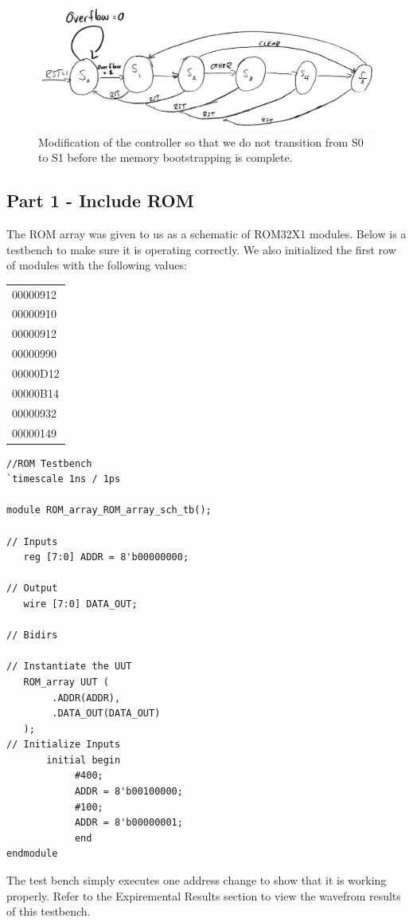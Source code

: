 \documentclass[12pt]{article}
\begin{document}
		\begin{figure}[h]
			\includegraphics[scale=.175]{Prelab2}
			\caption{Modification of the controller so that we do not transition from S0 to S1 before the memory bootstrapping is complete.}
		\end{figure}
		
		\newpage
	\subsection{Part 1 - Include ROM}
	The ROM array was given to us as a schematic of ROM32X1 modules. Below is a testbench to make sure it is operating correctly. We also initialized the first row of modules with the following values:

\begin{flushleft}
\begin{tabular}{|l|}
\hline
00000912 \\
00000910 \\
00000912 \\
00000990 \\
00000D12 \\
00000B14 \\
00000932 \\
00000149 \\
\hline
\end{tabular}
\end{flushleft}

		
		\begin{Verbatim}[frame=single, fontsize= \small]
//ROM Testbench
`timescale 1ns / 1ps

module ROM_array_ROM_array_sch_tb();

// Inputs
   reg [7:0] ADDR = 8'b00000000;

// Output
   wire [7:0] DATA_OUT;

// Bidirs

// Instantiate the UUT
   ROM_array UUT (
		.ADDR(ADDR), 
		.DATA_OUT(DATA_OUT)
   );
// Initialize Inputs
       initial begin
			#400;
			ADDR = 8'b00100000;
			#100;
			ADDR = 8'b00000001;
			end
endmodule
		\end{Verbatim}
		The test bench simply executes one address change to show that it is working properly. Refer to the Expiremental Results section to view the wavefrom results of this testbench.
		\newpage
\end{document}

